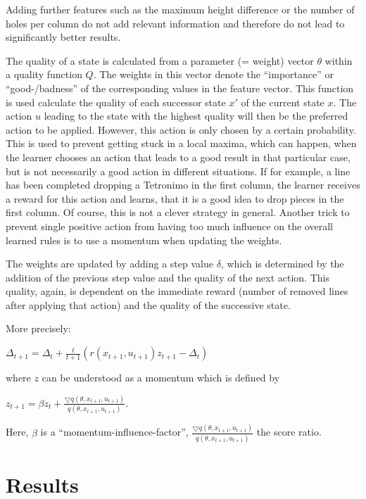 \documentclass{ml}
\begin{document}
Adding further features such as the maximum height difference or the number of holes per column do not add relevant information and therefore do not lead to significantly better results. 


The quality of a state is calculated from a parameter (= weight) vector $\theta$ within a quality function $Q$.
The weights in this vector denote the ``importance'' or ``good-/badness'' of the corresponding values in the feature vector. 
This function is used calculate the quality of each successor state $x'$ of the current state $x$. 
The action $u$ leading to the state with the highest quality will then be the preferred action to be applied.
However, this action is only chosen by a certain probability.
This is used to prevent getting stuck in a local maxima, which can happen, when the learner chooses an action that leads to a good result in that particular case, but is not necessarily a good action in different situations. 
If for example, a line has been completed dropping a Tetronimo in the first column, the learner receives a reward for this action and learns, that it is a good idea to drop pieces in the first column. 
Of course, this is not a clever strategy in general. 
Another trick to prevent single positive action from having too much influence on the overall learned rules is to use a momentum when updating the weights.

The weights are updated by adding a step value $\delta$, which is determined by the addition of the previous step value and the quality of the next action. 
This quality, again, is dependent on the immediate reward (number of removed lines after applying that action) and the quality of the successive state. 

More precisely:

$\Delta_{t+1} = \Delta_t + \frac{t}{t+1}(r(x_{t+1},u_{t+1})z_{t+1} - \Delta_t)$

where $z$ can be understood as a momentum which is defined by

$z_{t+1} = \beta z_t + \frac{\bigtriangledown q(\theta,x_{t+1},u_{t+1})}{q(\theta,x_{t+1},u_{t+1})}$.

Here, $\beta$ is a ``momentum-influence-factor'', $\frac{\bigtriangledown q(\theta,x_{t+1},u_{t+1})}{q(\theta,x_{t+1},u_{t+1})}$ the score ratio.


\section{Results}
\label{results}
\end{document}
